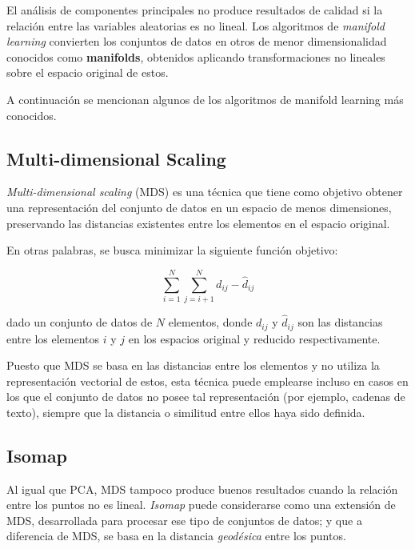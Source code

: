 El análisis de componentes principales no produce resultados de calidad si la relación entre las variables aleatorias es no lineal.
Los algoritmos de \textit{manifold learning} convierten los conjuntos de datos en otros de menor dimensionalidad conocidos como \textbf{manifolds}, obtenidos aplicando transformaciones no lineales sobre el espacio original de estos.

A continuación se mencionan algunos de los algoritmos de manifold learning más conocidos.

\subsection{Multi-dimensional Scaling}\label{subsec:MDS}

\textit{Multi-dimensional scaling} (MDS) es una técnica que tiene como objetivo obtener una representación del conjunto de datos en un espacio de menos dimensiones, preservando las distancias existentes entre los elementos en el espacio original.

En otras palabras, se busca minimizar la siguiente función objetivo:

\begin{equation}
    \label{eq:MDS}
    \sum_{i=1}^{N}\sum_{j=i+1}^{N}{d_{ij} - \hat{d}_{ij}}
\end{equation}

\noindent
dado un conjunto de datos de $N$ elementos, donde $d_{ij}$ y $\hat{d}_{ij}$ son las distancias entre los elementos $i$ y $j$ en los espacios original y reducido respectivamente.

Puesto que MDS se basa en las distancias entre los elementos y no utiliza la representación vectorial de estos, esta técnica puede emplearse incluso en casos en los que el conjunto de datos no posee tal representación (por ejemplo, cadenas de texto), siempre que la distancia o similitud entre ellos haya sido definida.

\subsection{Isomap}\label{subsec:isomap}

Al igual que PCA, MDS tampoco produce buenos resultados cuando la relación entre los puntos no es lineal.
\textit{Isomap} puede considerarse como una extensión de MDS, desarrollada para procesar ese tipo de conjuntos de datos; y que a diferencia de MDS, se basa en la distancia \textit{geodésica} entre los puntos.

